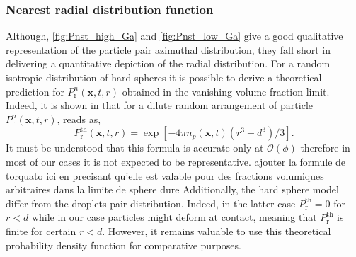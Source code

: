 

\subsubsection*{Nearest radial distribution function }

Although, \ref{fig:Pnst_high_Ga} and \ref{fig:Pnst_low_Ga} give a good qualitative representation of the particle pair azimuthal distribution, they fall short in delivering a quantitative depiction of the radial distribution. %
For a random isotropic distribution of hard spheres it is possible to derive a theoretical prediction for $P_\text{r}^n(\textbf{x},t,r)$ obtained in the vanishing volume fraction limit. 
Indeed, it is shown in \citet{zhang2021ensemble} that for a dilute random arrangement of particle $P_\text{r}^n(\textbf{x},t,r)$, reads as, 
\begin{equation}
    P_\text{r}^\text{th}(\textbf{x},t,r) = \exp[{-4 \pi n_p(\textbf{x},t) (r^3 - d^3)/3}].
    \label{eq:Pnst_dilute}
\end{equation}
It must be understood that this formula is accurate only at $\mathcal{O}(\phi)$ therefore in most of our cases it is not expected to be representative. \color{blue} ajouter la formule de torquato ici en precisant qu'elle est valable pour des fractions volumiques arbitraires dans la limite de sphere dure \color{black}
Additionally, the hard sphere model differ from the droplets pair distribution.
Indeed, in the latter case $P_\text{r}^\text{th} = 0$ for $r<d$ while in our case particles might deform at contact, meaning that $P_\text{r}^\text{th}$ is finite for certain $r<d$. 
However, it remains valuable to use this theoretical probability density function for comparative purposes. 

